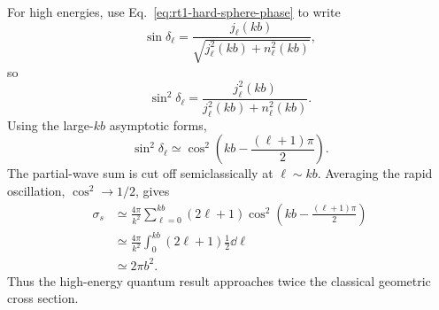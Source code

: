For high energies, use Eq.~\eqref{eq:rt1-hard-sphere-phase} to write
\[
  \sin\delta_\ell
  =\frac{j_\ell(kb)}{\sqrt{j_\ell^2(kb)+n_\ell^2(kb)}},
\]
so
\begin{equation*}
  \sin^2\delta_\ell
  =\frac{j_\ell^2(kb)}{j_\ell^2(kb)+n_\ell^2(kb)}.
  \tag{26}
\end{equation*}
Using the large-$kb$ asymptotic forms,
\begin{equation*}
  \sin^2\delta_\ell
  \simeq\cos^2\left(kb-\frac{(\ell+1)\pi}{2}\right).
  \tag{27}
\end{equation*}
The partial-wave sum is cut off semiclassically at $\ell\sim kb$.  Averaging the rapid oscillation, $\cos^2\to1/2$, gives
\begin{align*}
  \sigma_s
  &\simeq\frac{4\pi}{k^2}
  \sum_{\ell=0}^{kb}(2\ell+1)
  \cos^2\left(kb-\frac{(\ell+1)\pi}{2}\right)\\
  &\simeq\frac{4\pi}{k^2}
  \int_0^{kb}(2\ell+1)\frac12\dd\ell\\
  &\simeq 2\pi b^2.
\end{align*}
Thus the high-energy quantum result approaches twice the classical geometric cross section.
